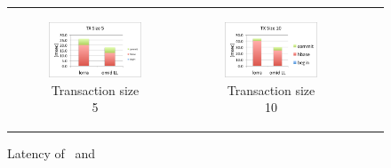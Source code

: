 \begin{figure}[]
\begin{tabular}{cccc}
    \begin{subfigure}[t]{0.4\textwidth}
	\includegraphics[width=\textwidth]{figs/lorravslltx5.pdf}
    \caption[]{Transaction size 5}
    \label{fig:latency:read}
    \label{fig:latency:lorra5}
  \end{subfigure} &

  \begin{subfigure}[t]{0.4\textwidth}
	\includegraphics[width=\textwidth]{figs/lorravslltx10.pdf}
    \caption[]{Transaction size 10}
    \label{fig:latency:lorra10}
  \end{subfigure} \\
  
    
  \end{tabular}
  \caption{Latency of \sys\ and \sysll\ }
\end{figure}


